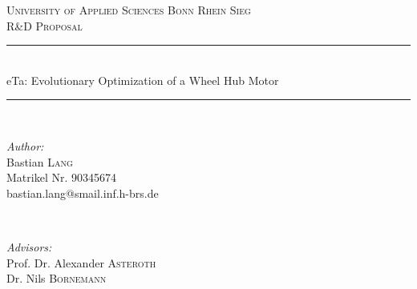 \documentclass[12pt]{article}
\begin{document}
\begin{titlepage}

\newcommand{\HRule}{\rule{\linewidth}{0.5mm}} %

\center %
 

\textsc{\Large University of Applied Sciences Bonn Rhein Sieg}\\[0.4cm] %
\textsc{\Large R\&D Proposal}\\[0.5cm] %


\HRule \\[0.4cm]
{ \large eTa: Evolutionary Optimization of a Wheel Hub Motor}\\[0.01cm] %
\HRule \\[1.5cm]
 

\begin{minipage}{0.4\textwidth}
\begin{flushleft} \large
\emph{Author:}\\ [0.0cm]
Bastian \textsc{Lang}\\ [0.0cm] %
\small{ Matrikel Nr. 90345674} \\ [0.0cm]
\footnotesize{ bastian.lang@smail.inf.h-brs.de}
\end{flushleft}
\end{minipage}
~
\begin{minipage}{0.55\textwidth}
\begin{flushright} \large
\emph{Advisors:} \\ [0.0cm]
Prof. Dr. Alexander \textsc{Asteroth} \\ %
Dr. Nils \textsc{Bornemann}
\end{flushright}
\end{minipage}\\[4cm]


\end{titlepage}
\end{document}
